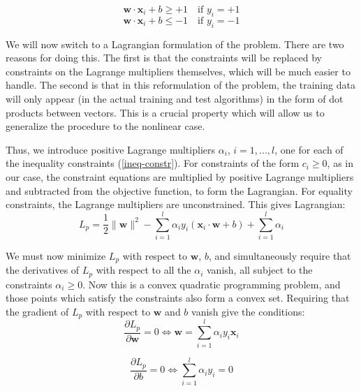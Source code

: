 \begin{equation}
\mathbf{w} \cdot \mathbf{x}_i + b \ge +1 \quad \text{if } y_i = +1
\label{const1}
\end{equation}
\begin{equation}
\mathbf{w} \cdot \mathbf{x}_i + b \le -1 \quad \text{if } y_i = -1
\label{constr2}
\end{equation}

We will now switch to a Lagrangian formulation of the problem. There are two reasons
for doing this. The first is that the constraints will be replaced by constraints on the
Lagrange multipliers themselves, which will be much easier to handle. The second is that
in this reformulation of the problem, the training data will only appear (in the actual training
and test algorithms) in the form of dot products between vectors. This is a crucial property
which will allow us to generalize the procedure to the nonlinear case.

Thus, we introduce positive Lagrange multipliers $\alpha_i$, $i = 1, ... , l$, one for each of the
inequality constraints (\ref{ineq-constr}). For constraints of the form $c_i \ge 0$, as in our case, the
constraint equations are multiplied by positive Lagrange multipliers and subtracted from the objective function, to form the Lagrangian. For equality constraints, the Lagrange multipliers are unconstrained. This gives Lagrangian:
\begin{equation}
L_p = \frac{1}{2} \| \mathbf{w} \|^2 - \sum_{i=1}^l \alpha_i y_i (\mathbf{x}_i \cdot \mathbf{w} + b) + \sum_{i=1}^l \alpha_i
\label{Lp}
\end{equation}

We must now minimize $L_p$ with respect to $\mathbf{w}$, $b$, and simultaneously require that the
derivatives of $L_p$ with respect to all the $\alpha_i$ vanish, all subject to the constraints $\alpha_i \ge 0$. Now this is a convex quadratic programming
problem, and those points which satisfy the
constraints also form a convex set. Requiring that the gradient of $L_p$ with respect to $\mathbf{w}$ and $b$ vanish give the conditions:
\begin{equation}
\frac{\partial L_p}{\partial \mathbf{w}} = 0 \Longleftrightarrow \mathbf{w} = \sum_{i=1}^l \alpha_i y_i \mathbf{x}_i
\label{14}
\end{equation}

\begin{equation}
\frac{\partial L_p}{\partial b} = 0 \Longleftrightarrow \sum_{i=1}^l \alpha_i y_i =0
\label{15}
\end{equation}

